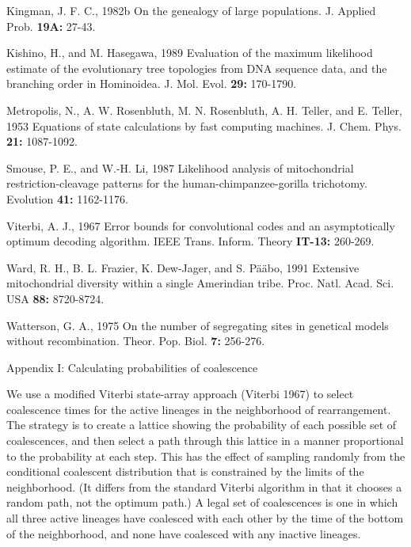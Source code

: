 \documentclass[12pt]{article}
\begin{document}
{\medskip
{\sc Kingman,} J. F. C.,  1982b  On the genealogy of large populations.  J.
     Applied Prob. {\bf 19A:} 27-43.

\medskip
{\sc Kishino,} H., and M. {\sc Hasegawa,} 1989  Evaluation of the maximum likelihood
estimate of the evolutionary tree topologies from DNA sequence data, and
the branching order in Hominoidea.  J. Mol. Evol. {\bf 29:} 170-1790.

\medskip
{\sc Metropolis,} N., A. W. {\sc Rosenbluth,} M. N. 
{\sc Rosenbluth,} A. H. {\sc Teller,} and E. {\sc Teller},
1953  Equations of state calculations by fast computing machines.  J.
Chem. Phys. {\bf 21:} 1087-1092.

\medskip
{\sc Smouse,} P. E., and W.-H. {\sc Li}, 1987  Likelihood analysis of
mitochondrial
restriction-cleavage patterns for the human-chimpanzee-gorilla trichotomy.
Evolution  {\bf 41:} 1162-1176.

\medskip
{\sc Viterbi,} A. J., 1967  Error bounds for convolutional codes and an
asymptotically optimum decoding algorithm.  IEEE Trans. Inform. Theory
{\bf IT-13:} 260-269.

\medskip
{\sc Ward,} R. H., B. L. {\sc Frazier,} K. {\sc Dew-Jager,} 
and S. {\sc P\"{a}\"{a}bo}, 1991
Extensive mitochondrial diversity within a single Amerindian tribe.
Proc. Natl. Acad. Sci. USA {\bf 88:} 8720-8724.

\medskip
{\sc Watterson}, G. A., 1975  On the number of segregating sites in genetical
models without recombination.  Theor. Pop. Biol. {\bf 7:} 256-276.

}

\newpage

Appendix I:  Calculating probabilities of coalescence
\bigskip

We use a modified Viterbi state-array approach ({\sc Viterbi} 1967) to 
select coalescence times for
the active lineages in the neighborhood of rearrangement.  The strategy
is to create a lattice showing the probability of each possible set of
coalescences, and then select a path through this lattice in a manner
proportional to the probability at each step.  This has the effect of
sampling randomly from the conditional coalescent distribution that is constrained by the
limits of the neighborhood.  (It differs from the standard Viterbi
algorithm in that it chooses a random path, not the optimum path.)
A legal set of coalescences is one in which all three active lineages
have coalesced with each other by the time of the bottom of the
neighborhood, and none have coalesced with any inactive lineages.
\end{document}
